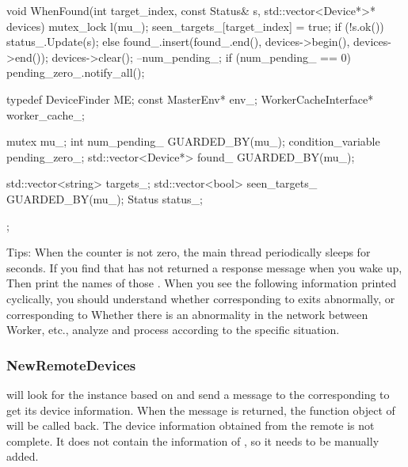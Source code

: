 \begin{content}
\begin{leftbar}
\begin{c++}
{  void WhenFound(int target_index, const Status& s,
                 std::vector<Device*>* devices) {
    mutex_lock l(mu_);
    seen_targets_[target_index] = true;
    if (!s.ok()) {
      status_.Update(s);
    } else {
      found_.insert(found_.end(), devices->begin(), devices->end());
      devices->clear();
    }
    --num_pending_;
    if (num_pending_ == 0) {
      pending_zero_.notify_all();
    }
  }

  typedef DeviceFinder ME;
  const MasterEnv* env_;
  WorkerCacheInterface* worker_cache_;

  mutex mu_;
  int num_pending_ GUARDED_BY(mu_);
  condition_variable pending_zero_;
  std::vector<Device*> found_ GUARDED_BY(mu_);

  std::vector<string> targets_;
  std::vector<bool> seen_targets_ GUARDED_BY(mu_);
  Status status_;
};
\end{c++}
\end{leftbar}

Tips: When the  counter is not zero, the main thread periodically sleeps for  seconds. If you find that  has not returned a response message when you wake up, Then print the names of those . When you see the following information printed cyclically, you should understand whether  corresponding to  exits abnormally, or \ascii corresponding to  Whether there is an abnormality in the network between {Worker}, etc., analyze and process according to the specific situation.


\subsubsection{NewRemoteDevices}

 will look for the  instance based on  and send a  message to the corresponding  to get its device information. When the message is returned, the function object of  will be called back. The device information obtained from the remote  is not complete. It does not contain the information of , so it needs to be manually added.


\end{content}
